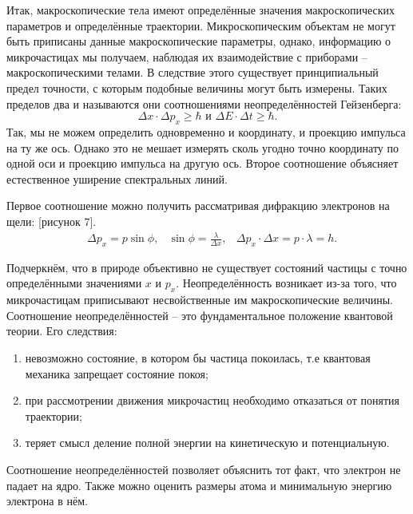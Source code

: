 Итак, макроскопические тела имеют определённые значения макроскопических
параметров и определённые траектории. Микроскопическим объектам не могут быть
приписаны данные макроскопические параметры, однако, информацию о микрочастицах
мы получаем, наблюдая их взаимодействие с приборами -- макроскопическими телами.
В следствие этого существует принципиальный предел точности, с которым подобные
величины могут быть измерены. Таких пределов два и называются они соотношениями
неопределённостей Гейзенберга:
\[
    \Delta x \cdot \Delta p_x \ge \hbar \text{ и }
    \Delta E \cdot \Delta t \ge \hbar.
\]
Так, мы не можем определить одновременно и координату, и проекцию импульса на ту
же ось. Однако это не мешает измерять сколь угодно точно координату по одной оси
и проекцию импульса на другую ось. Второе соотношение объясняет естественное
уширение спектральных линий.

Первое соотношение можно получить рассматривая дифракцию электронов на щели:
[рисунок 7].
\begin{align*}
    & \Delta p_x = p \sin\phi,
    & \sin\phi = \frac{\lambda}{\Delta x},
    & \Delta p_x \cdot \Delta x = p \cdot \lambda = h.
\end{align*}

Подчеркнём, что в природе объективно не существует состояний частицы с точно
определёнными значениями \( x \) и \( p_x \). Неопределённость возникает из-за
того, что микрочастицам приписывают несвойственные им макроскопические величины.
Соотношение неопределённостей -- это фундаментальное положение квантовой теории.
Его следствия:
\begin{enumerate}
    \item невозможно состояние, в котором бы частица покоилась, т.е квантовая
        механика запрещает состояние покоя;
    \item при рассмотрении движения микрочастиц необходимо отказаться от
        понятия траектории;
    \item теряет смысл деление полной энергии на кинетическую и потенциальную.
\end{enumerate}

Соотношение неопределённостей позволяет объяснить тот факт, что электрон
не падает на ядро. Также можно оценить размеры атома и минимальную энергию
электрона в нём.
